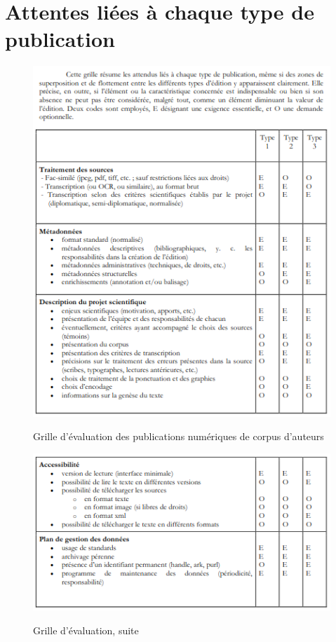 \bigskip
\section{Attentes liées à chaque type de publication}

\begin{figure}[H]
    \centering
    \caption{Grille d’évaluation des publications numériques de corpus d’auteurs}
    \includegraphics[width=16cm]{images/evaluation_publ_numiq1.png}
    \label{evaluation_publ_numiq1}
\end{figure}

\begin{figure}[H]
    \centering
    \caption{Grille d’évaluation, suite}
    \includegraphics[width=16cm]{images/evaluation_publ_numiq2.png}
    \label{evaluation_publ_numiq2}
\end{figure}


